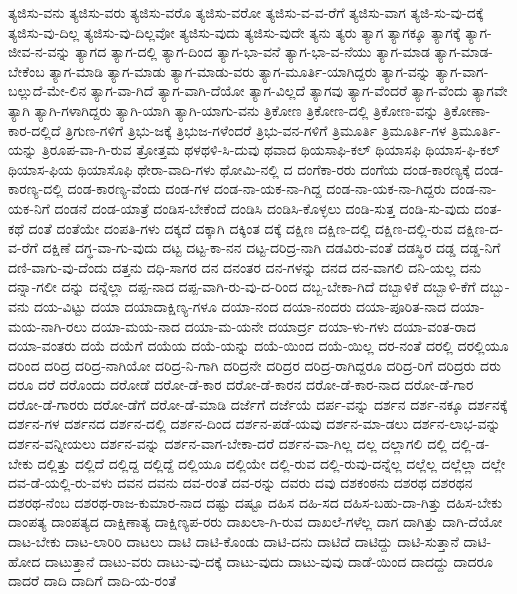 {ತ್ಯಜಿಸು-ವನು
ತ್ಯಜಿಸು-ವರು
ತ್ಯಜಿಸು-ವರೊ
ತ್ಯಜಿಸು-ವರೋ
ತ್ಯಜಿಸು-ವ-ವ-ರೆಗೆ
ತ್ಯಜಿಸು-ವಾಗ
ತ್ಯಜಿ-ಸು-ವು-ದಕ್ಕೆ
ತ್ಯಜಿಸು-ವು-ದಿಲ್ಲ
ತ್ಯಜಿಸು-ವು-ದಿಲ್ಲವೋ
ತ್ಯಜಿಸು-ವುದು
ತ್ಯಜಿಸು-ವುದೇ
ತ್ಯನು
ತ್ಯರು
ತ್ಯಾಗ
ತ್ಯಾಗಕ್ಕೂ
ತ್ಯಾಗಕ್ಕೆ
ತ್ಯಾಗ-ಜೀವ-ನ-ವನ್ನು
ತ್ಯಾಗದ
ತ್ಯಾಗ-ದಲ್ಲಿ
ತ್ಯಾಗ-ದಿಂದ
ತ್ಯಾಗ-ಭಾ-ವನೆ
ತ್ಯಾಗ-ಭಾ-ವ-ನೆಯು
ತ್ಯಾಗ-ಮಾಡ
ತ್ಯಾಗ-ಮಾಡ-ಬೇಕೆಂಬ
ತ್ಯಾಗ-ಮಾಡಿ
ತ್ಯಾಗ-ಮಾಡು
ತ್ಯಾಗ-ಮಾಡು-ವರು
ತ್ಯಾಗ-ಮೂರ್ತಿ-ಯಾಗಿದ್ದರು
ತ್ಯಾಗ-ವನ್ನು
ತ್ಯಾಗ-ವಾಗ-ಬಲ್ಲುದೆ-ಮೇ-ಲಿನ
ತ್ಯಾಗ-ವಾ-ಗಿದೆ
ತ್ಯಾಗ-ವಾಗಿ-ದೆಯೋ
ತ್ಯಾಗ-ವಿಲ್ಲದೆ
ತ್ಯಾಗವು
ತ್ಯಾಗ-ವೆಂದರೆ
ತ್ಯಾಗ-ವೆಂದು
ತ್ಯಾಗವೇ
ತ್ಯಾಗಿ
ತ್ಯಾಗಿ-ಗಳಾಗಿದ್ದರು
ತ್ಯಾಗಿ-ಯಾಗಿ
ತ್ಯಾಗಿ-ಯಾಗು-ವನು
ತ್ರಿಕೋಣ
ತ್ರಿಕೋಣ-ದಲ್ಲಿ
ತ್ರಿಕೋಣ-ವನ್ನು
ತ್ರಿಕೋಣಾ-ಕಾರ-ದಲ್ಲಿದೆ
ತ್ರಿಗುಣ-ಗಳಿಗೆ
ತ್ರಿಭು-ಜಕ್ಕೆ
ತ್ರಿಭುಜ-ಗಳೆಂದರೆ
ತ್ರಿಭು-ವನ-ಗಳಿಗೆ
ತ್ರಿಮೂರ್ತಿ
ತ್ರಿಮೂರ್ತಿ-ಗಳ
ತ್ರಿಮೂರ್ತಿ-ಯನ್ನು
ತ್ರಿರೂಪ-ವಾ-ಗಿ-ರುವ
ತ್ರೋತ್ತಮ
ಥಳಥಳಿ-ಸಿ-ದುವು
ಥವಾದ
ಥಿಯಸಾಫಿ-ಕಲ್
ಥಿಯಾಸಫಿ
ಥಿಯಾಸ-ಫಿ-ಕಲ್
ಥಿಯಾಸ-ಫಿಯ
ಥಿಯಾಸೊಫಿ
ಥೇರಾ-ವಾದಿ-ಗಳು
ಥೋಮಿ-ನಲ್ಲಿ
ದ
ದಂಗೆಕಾ-ರರು
ದಂಗೆಯ
ದಂಡ-ಕಾರಣ್ಯಕ್ಕೆ
ದಂಡ-ಕಾರಣ್ಯ-ದಲ್ಲಿ
ದಂಡ-ಕಾರಣ್ಯ-ವೆಂದು
ದಂಡ-ಗಳ
ದಂಡ-ನಾ-ಯಕ-ನಾ-ಗಿದ್ದ
ದಂಡ-ನಾ-ಯಕ-ನಾ-ಗಿದ್ದರು
ದಂಡ-ನಾ-ಯಕ-ನಿಗೆ
ದಂಡನೆ
ದಂಡ-ಯಾತ್ರೆ
ದಂಡಿಸ-ಬೇಕೆಂದೆ
ದಂಡಿಸಿ
ದಂಡಿಸಿ-ಕೊಳ್ಳಲು
ದಂಡಿ-ಸುತ್ತ
ದಂಡಿ-ಸು-ವುದು
ದಂತ-ಕಥೆ
ದಂತೆ
ದಂತೆಯೇ
ದಂಪತಿ-ಗಳು
ದಕ್ಕದೆ
ದಕ್ಕಾಗಿ
ದಕ್ಕಿಂತ
ದಕ್ಕೆ
ದಕ್ಷಿಣ
ದಕ್ಷಿಣ-ದಲ್ಲಿ
ದಕ್ಷಿಣ-ದಲ್ಲಿ-ರುವ
ದಕ್ಷಿಣ-ದ-ವ-ರೆಗೆ
ದಕ್ಷಿಣೆ
ದಗ್ಧ-ವಾ-ಗು-ವುದು
ದಟ್ಟ
ದಟ್ಟ-ಕಾ-ನನ
ದಟ್ಟ-ದರಿದ್ರ-ನಾಗಿ
ದಡವಿರು-ವಂತೆ
ದಡಸ್ಥಿರ
ದಡ್ಡ
ದಡ್ಡ-ನಿಗೆ
ದಣಿ-ವಾಗು-ವು-ದೆಂದು
ದತ್ತನು
ದಧಿ-ಸಾಗರ
ದನ
ದನಂತರ
ದನ-ಗಳನ್ನು
ದನದ
ದನ-ವಾಗಲಿ
ದನಿ-ಯಲ್ಲ
ದನು
ದನ್ನಾ-ಗಲೀ
ದನ್ನು
ದನ್ನೆಲ್ಲಾ
ದಪ್ಪ-ನಾದ
ದಪ್ಪ-ವಾಗಿ-ರು-ವು-ದ-ರಿಂದ
ದಬ್ಬ-ಬೇಕಾ-ಗಿದೆ
ದಬ್ಬಾಳಿಕೆ
ದಬ್ಬಾಳಿ-ಕೆಗೆ
ದಬ್ಬು-ವನು
ದಯ-ವಿಟ್ಟು
ದಯಾ
ದಯಾದಾಕ್ಷಿಣ್ಯ-ಗಳೂ
ದಯಾ-ನಂದ
ದಯಾ-ನಂದರು
ದಯಾ-ಪೂರಿತ-ನಾದ
ದಯಾ-ಮಯ-ನಾಗಿ-ರಲು
ದಯಾ-ಮಯ-ನಾದ
ದಯಾ-ಮ-ಯನೇ
ದಯಾರ್ದ್ರ
ದಯಾ-ಳು-ಗಳು
ದಯಾ-ವಂತ-ರಾದ
ದಯಾ-ವಂತರು
ದಯೆ
ದಯೆಗೆ
ದಯೆಯ
ದಯೆ-ಯನ್ನು
ದಯೆ-ಯಿಂದ
ದಯೆ-ಯಿಲ್ಲ
ದರ-ನಂತೆ
ದರಲ್ಲಿ
ದರಲ್ಲಿಯೂ
ದರಿಂದ
ದರಿದ್ರ
ದರಿದ್ರ-ನಾಗಿಯೋ
ದರಿದ್ರ-ನಿ-ಗಾಗಿ
ದರಿದ್ರನೇ
ದರಿದ್ರರ
ದರಿದ್ರ-ರಾಗಿದ್ದರೂ
ದರಿದ್ರ-ರಿಗೆ
ದರಿದ್ರರು
ದರು
ದರೂ
ದರೆ
ದರೊಂದು
ದರೋಡೆ
ದರೋ-ಡೆ-ಕಾರ
ದರೋ-ಡೆ-ಕಾರನ
ದರೋ-ಡೆ-ಕಾರ-ನಾದ
ದರೋ-ಡೆ-ಗಾರ
ದರೋ-ಡೆ-ಗಾರರು
ದರೋ-ಡೆಗೆ
ದರೋ-ಡೆ-ಮಾಡಿ
ದರ್ಜೆಗೆ
ದರ್ಜೆಯೆ
ದರ್ಪ-ವನ್ನು
ದರ್ಶನ
ದರ್ಶ-ನಕ್ಕೂ
ದರ್ಶನಕ್ಕೆ
ದರ್ಶನ-ಗಳ
ದರ್ಶನದ
ದರ್ಶನ-ದಲ್ಲಿ
ದರ್ಶನ-ದಿಂದ
ದರ್ಶನ-ಪಡೆ-ಯವು
ದರ್ಶನ-ಮಾ-ಡಲು
ದರ್ಶನ-ಲಾಭ-ವನ್ನು
ದರ್ಶನ-ವನ್ನೀಯಲು
ದರ್ಶನ-ವನ್ನು
ದರ್ಶನ-ವಾಗ-ಬೇಕಾ-ದರೆ
ದರ್ಶನ-ವಾ-ಗಿಲ್ಲ
ದಲ್ಲ
ದಲ್ಲಾಗಲಿ
ದಲ್ಲಿ
ದಲ್ಲಿ-ಡ-ಬೇಕು
ದಲ್ಲಿತ್ತು
ದಲ್ಲಿದೆ
ದಲ್ಲಿದ್ದ
ದಲ್ಲಿದ್ದೆ
ದಲ್ಲಿಯೂ
ದಲ್ಲಿಯೇ
ದಲ್ಲಿ-ರುವ
ದಲ್ಲಿ-ರುವು-ದನ್ನೆಲ್ಲ
ದಲ್ಲೆಲ್ಲ
ದಲ್ಲೆಲ್ಲಾ
ದಲ್ಲೇ
ದವ-ಡೆ-ಯಲ್ಲಿ-ರು-ವಳು
ದವನ
ದವನು
ದವ-ರಂತೆ
ದವ-ರನ್ನು
ದವರು
ದವು
ದಶಕಂಠನು
ದಶರಥ
ದಶರಥನ
ದಶರಥ-ನೆಂಬ
ದಶರಥ-ರಾಜ-ಕುಮಾರ-ನಾದ
ದಷ್ಟು
ದಷ್ಟೂ
ದಹಿಸ
ದಹಿ-ಸದ
ದಹಿಸ-ಬಹು-ದಾ-ಗಿತ್ತು
ದಹಿಸ-ಬೇಕು
ದಾಂಪತ್ಯ
ದಾಂಪತ್ಯದ
ದಾಕ್ಷಿಣಾತ್ಯ
ದಾಕ್ಷಿಣ್ಯಪ-ರರು
ದಾಖಲಾ-ಗಿ-ರುವ
ದಾಖಲೆ-ಗಳೆಲ್ಲ
ದಾಗ
ದಾಗಿತ್ತು
ದಾಗಿ-ದೆಯೋ
ದಾಟ-ಬೇಕು
ದಾಟ-ಲಾರಿರಿ
ದಾಟಲು
ದಾಟಿ
ದಾಟಿ-ಕೊಂಡು
ದಾಟಿ-ದನು
ದಾಟಿದೆ
ದಾಟಿದ್ದು
ದಾಟಿ-ಸುತ್ತಾನೆ
ದಾಟಿ-ಹೋದ
ದಾಟುತ್ತಾನೆ
ದಾಟು-ವರು
ದಾಟು-ವು-ದಕ್ಕೆ
ದಾಟು-ವುದು
ದಾಟು-ವುವು
ದಾಡೆ-ಯಿಂದ
ದಾದದ್ದು
ದಾದರೂ
ದಾದರೆ
ದಾದಿ
ದಾದಿಗೆ
ದಾದಿ-ಯ-ರಂತೆ
}
